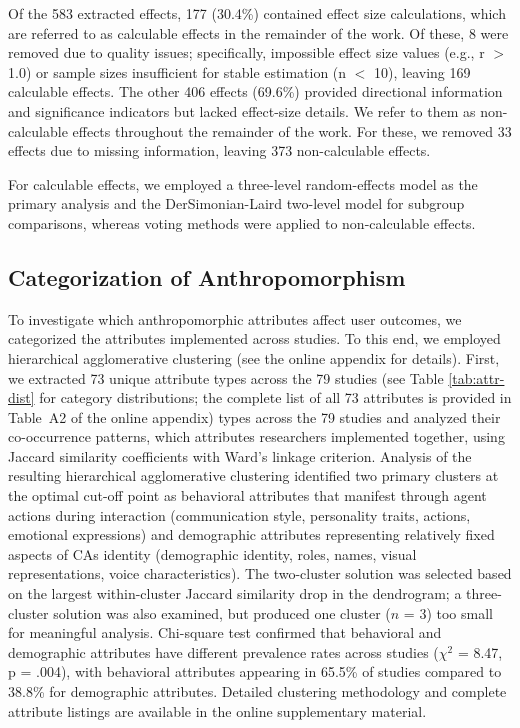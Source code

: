 \documentclass[preprint,review,12pt,authoryear,nonatbib]{elsarticle}
\begin{document}
Of the 583 extracted effects, 177 (30.4\%) contained effect size calculations, which are referred to as calculable effects in the remainder of the work. Of these, 8 were removed due to quality issues; specifically, impossible effect size values (e.g., r $>$ 1.0) or sample sizes insufficient for stable estimation (n $<$ 10), leaving 169 calculable effects. The other 406 effects (69.6\%) provided directional information and significance indicators but lacked effect-size details. We refer to them as non-calculable effects throughout the remainder of the work. For these, we removed 33 effects due to missing information, leaving 373 non-calculable effects. 

For calculable effects, we employed a three-level random-effects model as the primary analysis and the DerSimonian-Laird two-level model for subgroup comparisons, whereas voting methods were applied to non-calculable effects.

\subsection{Categorization of Anthropomorphism}

To investigate which anthropomorphic attributes affect user outcomes, we categorized the attributes implemented across studies. To this end, we employed hierarchical agglomerative clustering (see the online appendix for details). First, we extracted 73 unique attribute types across the 79 studies (see Table \ref{tab:attr-dist} for category distributions; the complete list of all 73 attributes is provided in Table~A2 of the online appendix)
types across the 79 studies and analyzed their co-occurrence patterns, which attributes researchers implemented together, using Jaccard similarity coefficients with Ward's linkage criterion. %
Analysis of the resulting hierarchical agglomerative clustering identified two primary clusters at the optimal cut-off point as behavioral attributes that manifest through agent actions during interaction (communication style, personality traits, actions, emotional expressions) and demographic attributes representing relatively fixed aspects of CAs identity (demographic identity, roles, names, visual representations, voice characteristics). The two-cluster solution was selected based on the largest within-cluster Jaccard similarity drop in the dendrogram; a three-cluster solution was also examined, but produced one cluster ($n$ = 3) too small for meaningful analysis. Chi-square test confirmed that behavioral and demographic attributes have different prevalence rates across studies ($\chi^2$ = 8.47, p = .004), with behavioral attributes appearing in 65.5\% of studies compared to 38.8\% for demographic attributes. Detailed clustering methodology and complete attribute listings are available in the online supplementary material.
\end{document}
